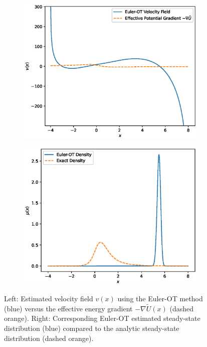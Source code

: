 \documentclass{article}
\begin{document}
\begin{figure}
    \centering
    \begin{subfigure}[b]{0.5\textwidth}
        \includegraphics[width=\textwidth]{figures/NonlinearFlowVelocityField.eps}
    \end{subfigure}%
    \begin{subfigure}[b]{0.5\textwidth}
        \includegraphics[width=\textwidth]{figures/NonlinearFlowDensity.eps}
    \end{subfigure}
    \caption{Left: Estimated velocity field $v(x)$ using the Euler-OT method (blue) versus the effective energy gradient $-\nabla \tilde{U}(x)$ (dashed orange). Right: Corresponding Euler-OT estimated steady-state distribution (blue) compared to the analytic steady-state distribution (dashed orange).}
    \label{fig:NonlinearFlow}
\end{figure}
\end{document}
